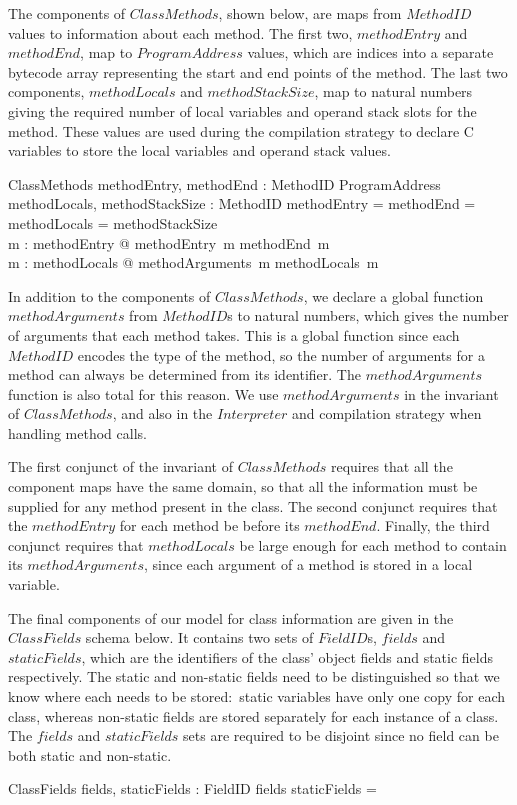 The components of $ClassMethods$, shown below, are maps from
$MethodID$ values to information about each method.
The first two, $methodEntry$ and $methodEnd$, map to $ProgramAddress$
values, which are indices into a separate bytecode array representing
the start and end points of the method.
The last two components, $methodLocals$ and $methodStackSize$, map to
natural numbers giving the required number of local variables and
operand stack slots for the method.
These values are used during the compilation strategy to declare C
variables to store the local variables and operand stack values.
\begin{schema}{ClassMethods}
  methodEntry, methodEnd : MethodID \pfun ProgramAddress \\
  methodLocals, methodStackSize : MethodID \pfun \nat
\where
  \dom methodEntry = \dom methodEnd = \dom methodLocals = \dom methodStackSize \\
  \forall m : \dom methodEntry @ methodEntry~m \leq methodEnd~m \\
  \forall m : \dom methodLocals @ methodArguments~m \leq methodLocals~m
\end{schema}
In addition to the components of $ClassMethods$, we declare a global
function $methodArguments$ from $MethodID$s to natural numbers, which
gives the number of arguments that each method takes.
This is a global function since each $MethodID$ encodes the type of
the method, so the number of arguments for a method can always be
determined from its identifier.
The $methodArguments$ function is also total for this reason.
We use $methodArguments$ in the invariant of $ClassMethods$, and also
in the $Interpreter$ and compilation strategy when handling method
calls.

The first conjunct of the invariant of $ClassMethods$ requires that
all the component maps have the same domain, so that all the
information must be supplied for any method present in the class.
The second conjunct requires that the $methodEntry$ for each method be
before its $methodEnd$.
Finally, the third conjunct requires that $methodLocals$ be large
enough for each method to contain its $methodArguments$, since each
argument of a method is stored in a local variable.

The final components of our model for class information are given in
the $ClassFields$ schema below.
It contains two sets of $FieldID$s, $fields$ and $staticFields$, which
are the identifiers of the class' object fields and static fields
respectively.
The static and non-static fields need to be distinguished so that we
know where each needs to be stored:~static variables have only one
copy for each class, whereas non-static fields are stored separately
for each instance of a class.
The $fields$ and $staticFields$ sets are required to be disjoint since
no field can be both static and non-static.
\begin{schema}{ClassFields}
  fields, staticFields : \finset FieldID
\where
  fields \cap staticFields = \emptyset
\end{schema}

